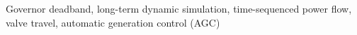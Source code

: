 Governor deadband, 
long-term dynamic simulation, 
time-sequenced power flow,
valve travel,
automatic generation control (AGC)